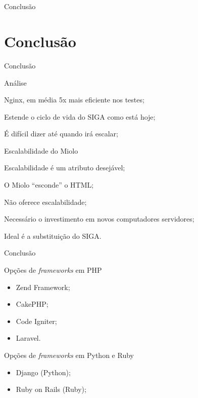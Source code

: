 \section*{}
\begin{frame}
	\centering
	{\Huge Conclusão}
\end{frame}

\section{Conclusão}\label{sec:conclusao}

\begin{frame}{Conclusão}
	\begin{block}{Análise}
		\begin{itemize}
			{\small \item Nginx, em média 5x mais eficiente nos testes; \pause
			\item Estende o ciclo de vida do SIGA como está hoje; \pause
			\item É difícil dizer até quando irá escalar; \pause}
		\end{itemize}
	\end{block}
	\begin{block}{Escalabilidade do Miolo}
		\begin{itemize}
			{\small \item Escalabilidade é um atributo desejável; \pause
			\item O Miolo ``esconde'' o HTML; \pause
			\item Não oferece escalabilidade; \pause
			\item Necessário o investimento em novos computadores servidores; 
			\pause
			\item Ideal é a substituição do SIGA.}
		\end{itemize}
	\end{block}
\end{frame}

\begin{frame}{Conclusão}
	\begin{block}{Opções de \textit{frameworks} em PHP}
		\begin{itemize}
			\item Zend Framework;
			\item CakePHP;
			\item Code Igniter;
			\item Laravel.
		\end{itemize}
	\end{block} \pause
	\begin{block}{Opções de \textit{frameworks} em Python e Ruby}
		\begin{itemize}
			\item Django (Python);
			\item Ruby on Rails (Ruby);
		\end{itemize}
	\end{block}
\end{frame}

